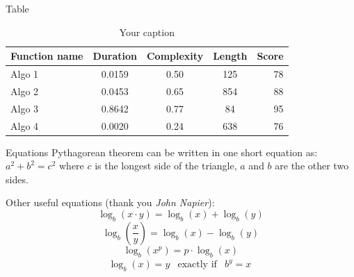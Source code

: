 \documentclass[aspectratio=1610]{beamer}
\begin{document}
\begin{frame}{Table}
\begin{center}
\begin{table}
\caption{Your caption}
\begin{tabular}{l | c | c | c | r}
\textbf{Function name} & \textbf{Duration} & \textbf{Complexity} & \textbf{Length} & \textbf{Score}\\
\hline \hline
Algo 1 & 0.0159 & 0.50 & 125 & 78 \\
Algo 2 & 0.0453 & 0.65 & 854 & 88 \\
Algo 3 & 0.8642 & 0.77 &  84 & 95 \\
Algo 4 & 0.0020 & 0.24 & 638 & 76 \\
\end{tabular}
\end{table}
\end{center}
\end{frame}

\begin{frame}{Equations}
Pythagorean theorem can be written in one short equation as: $a^2 + b^2 = c^2$ where $c$ is the longest side of the triangle, $a$ and $b$ are the other two sides.

\vfill %

Other useful equations (thank you \textit{John Napier}):
\begin{equation}
\log_b (x\cdot y) = \log_b (x) + \log_b (y)
\end{equation}
\begin{equation}
\log_b \left( \frac{x}{y} \right) = \log_b (x) - \log_b (y)
\end{equation}
\begin{equation}
\log_b (x^p) = p\cdot \log_b (x)
\end{equation}
\begin{eqnarray}
\log_b(x) = y & \text{exactly if} & b^y = x\
\end{eqnarray}
\end{frame}
\end{document}
